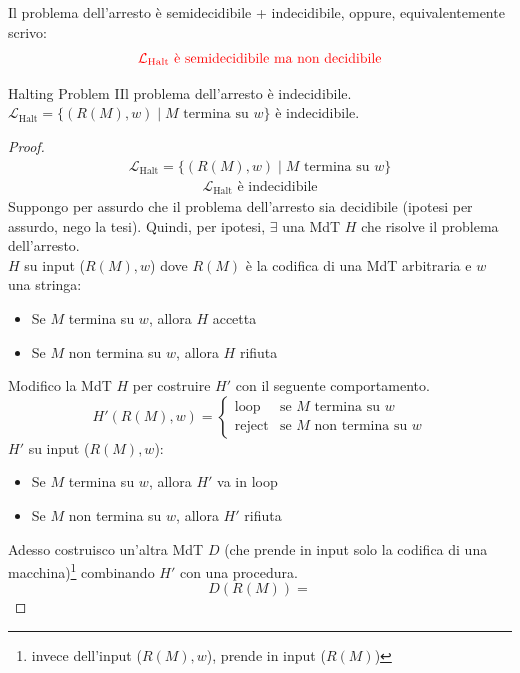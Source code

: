 \documentclass{article}  %
\theoremstyle{definition}
\begin{document}
Il problema dell'arresto è semidecidibile + indecidibile, oppure, equivalentemente scrivo:
\begin{align*}
	\textcolor{red}{\mathcal{L}_{\text{Halt}} \text{ è semidecidibile ma non decidibile}}
\end{align*}

\begin{theorem}{Halting Problem}
	IIl problema dell'arresto è indecidibile. \\
	$\mathcal{L}_{\text{Halt}} = \{(R(M),w) \mid M \text{ termina su } w\}$ è indecidibile.
	\footnotesize %
	\begin{proof}
		\begin{align*}
			\mathcal{L}_{\text{Halt}} = \{(R(M),w) \mid M \text{ termina su } w\} \tag*{(ipotesi)}
		\end{align*}
		\begin{align*}
			\mathcal{L}_{\text{Halt}} \text{ è indecidibile} \tag*{(tesi)}
		\end{align*}
		Suppongo per assurdo che il problema dell'arresto sia decidibile (ipotesi per assurdo, nego la tesi).
		Quindi, per ipotesi, $\exists$ una MdT $H$ che risolve il problema dell'arresto. \\
		$H$ su input ($R(M),w$) dove $R(M)$ è la codifica di una MdT arbitraria e $w$ una stringa:
		\begin{itemize}
			\item Se $M$ termina su $w$, allora $H$ accetta
			\item Se $M$ non termina su $w$, allora $H$ rifiuta
		\end{itemize}
		Modifico la MdT $H$ per costruire $H'$ con il seguente
		comportamento.
		\[
			H'(R(M),w) =
			\begin{cases}
				\text{loop}   & \text{se } M \text{ termina su } w      \\
				\text{reject} & \text{se } M \text{  non termina su } w
			\end{cases}
		\]
		$H'$ su input ($R(M),w$):
		\begin{itemize}
			\item Se $M$ termina su $w$, allora $H'$ va in loop
			\item Se $M$ non termina su $w$, allora $H'$ rifiuta
		\end{itemize}
		Adesso costruisco un'altra MdT $D$ (che prende in input solo la codifica di una macchina)\footnote{invece dell'input
			($R(M),w$), prende in input ($R(M)$)}
		combinando $H'$ con una procedura.
		\[
			D(R(M)) =
\]
\end{proof}
\end{theorem}
\end{document}
